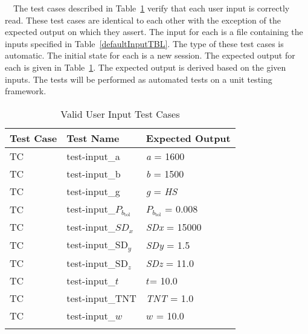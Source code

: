\documentclass[12pt]{article}
\newcounter{utestnum} %
\begin{document}
~\newline ~\newline \noindent The test cases described in Table~\ref{InputTests} 
verify that each user input is correctly read. These test cases are identical 
to each other with the exception of the expected output on which they assert. 
The input for each is a file containing the inputs specified in 
Table~\ref{defaultInputTBL}. The type of these test cases is automatic. The initial 
state for each is a new session. The expected output for each is given in 
Table~\ref{InputTests}. The expected output is derived based on the given 
inputs. The tests will be performed as automated tests on a unit testing 
framework.



\begin{longtable}{  l  p{4cm}  p{6cm}  }
	\hline
	\textbf{Test Case} & \textbf{Test Name} & \textbf{Expected Output} \\
	\hline
	TC{utestnum}\theutestnum  \label{TC_Length} & 
	test-input\_a &  \textit{a} = 1600\\
	\hline 
	TC{utestnum}\theutestnum  \label{TC_Breadth} & 
	test-input\_b &  \textit{b} = 1500\\ 
	\hline
	TC{utestnum}\theutestnum  \label{TC_GlassType} & 
	test-input\_g &  \textit{g} = \textit{HS}\\ 
	\hline
	TC{utestnum}\theutestnum  \label{TC_PbTol} & 
	test-input\_$P_{b_\text{tol}}$ &  $P_{b_\text{tol}}$ = 0.008\\ 
	\hline
	TC{utestnum}\theutestnum  \label{TC_SDx} & 
	test-input\_${SD}_x$ &  \textit{SDx} = 15000\\ 
	\hline
	TC{utestnum}\theutestnum  \label{TC_Sdy} & 
	test-input\_$\text{SD}_y$ &  \textit{SDy} = 1.5\\
	\hline 
	TC{utestnum}\theutestnum  \label{TC_SDz} & 
	test-input\_$\text{SD}_z$ &  \textit{SDz} = 11.0\\ 
	\hline
	TC{utestnum}\theutestnum  \label{TC_Thickness} & 
	test-input\_$t$ &  $t$= 10.0\\ 
	\hline
	TC{utestnum}\theutestnum  \label{TC_TNT} & 
	test-input\_TNT &  \textit{TNT} = 1.0\\ 
	\hline
	TC{utestnum}\theutestnum  \label{TC_W} & 
	test-input\_$w$ &  $w$ = 10.0\\ 
	\hline
	\caption{Valid User Input Test Cases}
	\label{InputTests}
\end{longtable}
\end{document}
